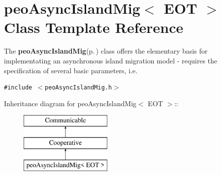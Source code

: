 \section{peo\-Async\-Island\-Mig$<$ EOT $>$ Class Template Reference}
\label{classpeo_async_island_mig}
The {\bf peo\-Async\-Island\-Mig}{\rm (p.\,\pageref{classpeo_async_island_mig})} class offers the elementary basis for implementating an asynchronous island migration model - requires the specification of several basic parameters, i.e.  


{\tt \#include $<$peo\-Async\-Island\-Mig.h$>$}

Inheritance diagram for peo\-Async\-Island\-Mig$<$ EOT $>$::\begin{figure}[H]
\begin{center}
\leavevmode
\includegraphics[height=3cm]{classpeo_async_island_mig}
\end{center}
\end{figure}
